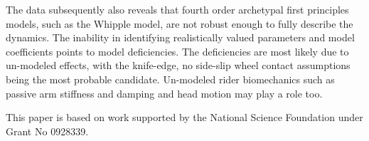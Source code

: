 \documentclass{article}
\begin{document}
The data subsequently also reveals that fourth order archetypal first
principles models, such as the Whipple model, are not robust enough to fully
describe the dynamics. The inability in identifying realistically valued
parameters and model coefficients points to model deficiencies. The
deficiencies are most likely due to un-modeled effects, with the knife-edge, no
side-slip wheel contact assumptions being the most probable candidate.
Un-modeled rider biomechanics such as passive arm stiffness and damping and
head motion may play a role too.

This paper is based on work supported by the National Science Foundation under
Grant No 0928339.
\end{document}
